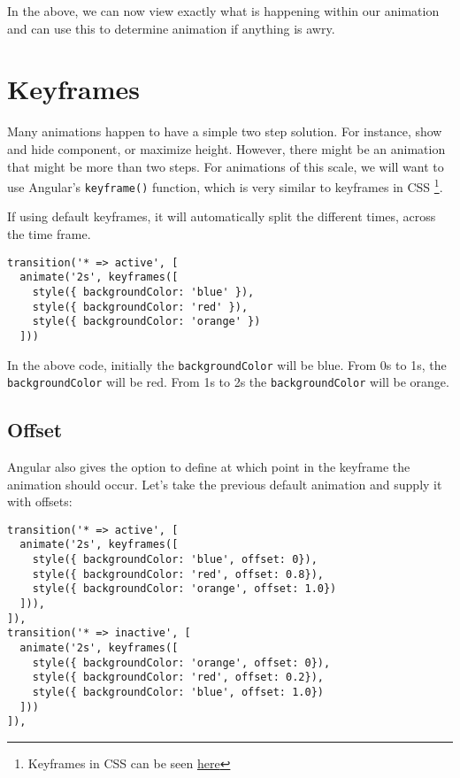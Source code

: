 In the above, we can now view exactly what is happening within our animation 
and can use this to determine animation if anything is awry. 

\section{ Keyframes }
Many animations happen to have a simple two step solution. For instance, show 
and hide component, or maximize height. However, there might be an animation 
that might be more than two steps. For animations of this scale, we will want
to use Angular's \lstinline{keyframe()} function, which is very similar to 
keyframes in CSS \footnote{Keyframes in CSS can be seen 
\href{https://www.w3schools.com/cssref/css3_pr_animation-keyframes.asp.}{here}}.

If using default keyframes, it will automatically split the different times, 
across the time frame. 

\begin{lstlisting}
transition('* => active', [
  animate('2s', keyframes([
    style({ backgroundColor: 'blue' }),
    style({ backgroundColor: 'red' }),
    style({ backgroundColor: 'orange' })
  ]))
\end{lstlisting}

In the above code, initially the \lstinline{backgroundColor} will be blue. 
From 0s to 1s, the \lstinline{backgroundColor} will be red. From 1s to 2s the 
\lstinline{backgroundColor} will be orange. 

\subsection{ Offset }
Angular also gives the option to define at which point in the keyframe the 
animation should occur. Let's take the previous default animation and supply  
it with offsets: 
\begin{lstlisting}
transition('* => active', [
  animate('2s', keyframes([
    style({ backgroundColor: 'blue', offset: 0}),
    style({ backgroundColor: 'red', offset: 0.8}),
    style({ backgroundColor: 'orange', offset: 1.0})
  ])),
]),
transition('* => inactive', [
  animate('2s', keyframes([
    style({ backgroundColor: 'orange', offset: 0}),
    style({ backgroundColor: 'red', offset: 0.2}),
    style({ backgroundColor: 'blue', offset: 1.0})
  ]))
]),
\end{lstlisting}


